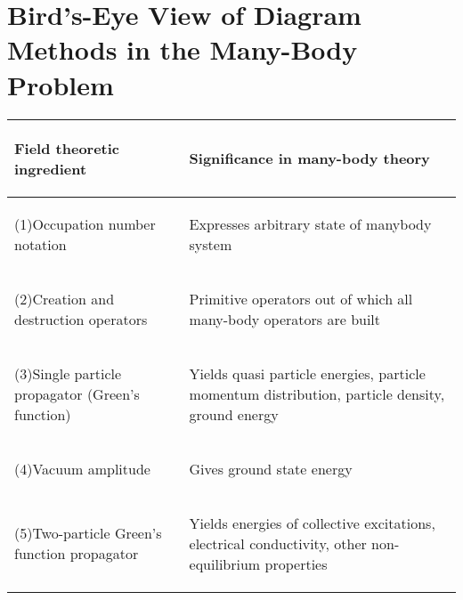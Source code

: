 \section{Bird's-Eye View of Diagram Methods in the
Many-Body Problem}
\begin{table}[H]
        \centering
        
\begin{tabular}{p{}p{}}
\hline 
 \begin{center}
Field theoretic ingredient
\end{center}
 & \begin{center}
Significance in many-body theory
\end{center}
 \\
\hline 
 \begin{center}
(1)Occupation number notation
\end{center}
 & \begin{center}
Expresses arbitrary state of manybody system
\end{center}
 \\
\begin{center}
(2)Creation and destruction operators
\end{center}
 & \begin{center}
Primitive operators out of which all many-body operators are built
\end{center}
 \\
\begin{center}
(3)Single particle propagator (Green's function)
\end{center}
 & \begin{center}
Yields quasi particle energies, particle momentum distribution, particle density, ground energy
\end{center}
 \\
\begin{center}
(4)Vacuum amplitude
\end{center}
 & \begin{center}
Gives ground state energy
\end{center}
 \\
\begin{center}
(5)Two-particle Green's function propagator 
\end{center}
 & \begin{center}
Yields energies of collective excitations, electrical conductivity, other non-equilibrium properties
\end{center}
 \\

\end{tabular}
\end{table}
